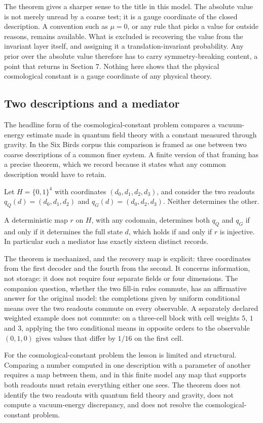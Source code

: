 The theorem gives a sharper sense to the title in this model. The
absolute value is not merely unread by a coarse test; it is a gauge
coordinate of the closed description. A convention such as \(\mu=0\), or
any rule that picks a value for outside reasons, remains available. What
is excluded is recovering the value from the invariant layer itself, and
assigning it a translation-invariant probability. Any prior over the
absolute value therefore has to carry symmetry-breaking content, a point
that returns in Section 7. Nothing here shows that the physical
cosmological constant is a gauge coordinate of any physical theory.

\hypertarget{two-descriptions-and-a-mediator}{%
\subsection{Two descriptions and a
mediator}\label{two-descriptions-and-a-mediator}}

The headline form of the cosmological-constant problem compares a
vacuum-energy estimate made in quantum field theory with a constant
measured through gravity. In the Six Birds corpus this comparison is
framed as one between two coarse descriptions of a common finer system.
A finite version of that framing has a precise theorem, which we record
because it states what any common description would have to retain.

Let \(H=\{0,1\}^4\) with coordinates \((d_0,d_1,d_2,d_3)\), and consider
the two readouts \(q_Q(d)=(d_0,d_1,d_2)\) and \(q_G(d)=(d_0,d_2,d_3)\).
Neither determines the other.

\begin{theorem}[Mediator]\label{thm:mediator}
A deterministic map $r$ on $H$, with any codomain, determines both $q_Q$ and $q_G$ if and only if it determines the full
state $d$, which holds if and only if $r$ is injective. In particular such a mediator has exactly sixteen distinct records.
\end{theorem}

The theorem is mechanized, and the recovery map is explicit: three
coordinates from the first decoder and the fourth from the second. It
concerns information, not storage: it does not require four separate
fields or four dimensions. The companion question, whether the two
fill-in rules commute, has an affirmative answer for the original model:
the completions given by uniform conditional means over the two readouts
commute on every observable. A separately declared weighted example does
not commute: on a three-cell block with cell weights \(5\), \(1\) and
\(3\), applying the two conditional means in opposite orders to the
observable \((0,1,0)\) gives values that differ by \(1/16\) on the first
cell.

For the cosmological-constant problem the lesson is limited and
structural. Comparing a number computed in one description with a
parameter of another requires a map between them, and in this finite
model any map that supports both readouts must retain everything either
one sees. The theorem does not identify the two readouts with quantum
field theory and gravity, does not compute a vacuum-energy discrepancy,
and does not resolve the cosmological-constant problem.
